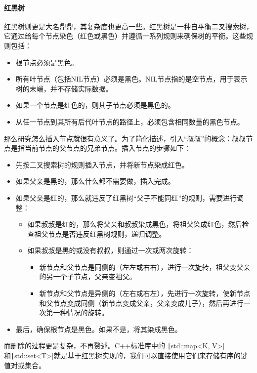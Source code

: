 \paragraph{红黑树}

红黑树则更是大名鼎鼎，其复杂度也更高一些。红黑树是一种自平衡二叉搜索树，它通过给每个节点染色（红色或黑色）并遵循一系列规则来确保树的平衡。这些规则包括：
\begin{itemize}
    \item 根节点必须是黑色。
    \item 所有叶节点（包括NIL节点）必须是黑色。NIL节点指的是空节点，用于表示树的末端，并不存储实际数据。
    \item 如果一个节点是红色的，则其子节点必须是黑色的。
    \item 从任一节点到其所有后代叶节点的路径上，必须包含相同数量的黑色节点。
\end{itemize}
那么研究怎么插入节点就很有意义了。为了简化描述，引入“叔叔”的概念：叔叔节点是指当前节点的父节点的兄弟节点。插入节点的步骤如下：
\begin{itemize}
    \item 先按二叉搜索树的规则插入节点，并将新节点染成红色。
    \item 如果父亲是黑的，那么什么都不需要做，插入完成。
    \item 如果父亲是红的，那么就违反了红黑树“父子不能同红”的规则，需要进行调整：
    \begin{itemize}
        \item 如果叔叔是红的，那么将父亲和叔叔染成黑色，将祖父染成红色，然后检查祖父节点是否违反红黑树规则，递归调整。
        \item 如果叔叔是黑的或没有叔叔，则通过一次或两次旋转：
        \begin{itemize}
            \item 新节点和父节点是同侧的（左左或右右），进行一次旋转，祖父变父亲的另一个子节点，父亲变祖父。
            \item 新节点和父节点是异侧的（左右或右左），先进行一次旋转，使新节点和父节点变成同侧（新节点变成父亲，父亲变成儿子），然后再进行一次第一种情况的旋转。
        \end{itemize}
    \end{itemize}
    \item 最后，确保根节点是黑色。如果不是，将其染成黑色。
\end{itemize}
而删除的过程更是复杂，不再赘述。C++标准库中的 \texttt|std::map<K, V>| 和\texttt|std::set<T>|就是基于红黑树实现的，我们可以直接使用它们来存储有序的键值对或集合。

